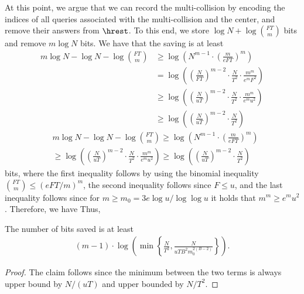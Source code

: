 At this point, we argue that we can record the multi-collision by encoding the indices of all queries associated with the multi-collision and the center, and remove their answers from $\hrest$. 
To this end, we store $\log N+\log\binom{FT}{m}$ bits and remove $m \log N$ bits. 
We have that the saving is at least 
\ifnum{}
\begin{align}
 m\log N - \log N-\log\binom{FT}{m} &\ge \log \left(N^{m-1}\cdot \left(\frac{m}{eFT}\right)^m\right)\nonumber\\
 & = \log \left(\left(\frac{N}{FT}\right)^{m-2}\cdot \frac{N}{T^2} \cdot\frac{m^m}{e^mF^2}\right)\nonumber\\
  & \ge \log \left(\left(\frac{N}{uT}\right)^{m-2}\cdot \frac{N}{T^2} \cdot\frac{m^m}{e^mu^2}\right)\nonumber\\
  & \ge \log \left(\left(\frac{N}{uT}\right)^{m-2}\cdot \frac{N}{T^2}\right) \label{eq:savings5MC}
\end{align}
\else
\begin{align}
 & m\log N - \log N-\log\binom{FT}{m} \ge \log \left(N^{m-1}\cdot \left(\frac{m}{eFT}\right)^m\right)\nonumber\\
 &  \ge \log \left(\left(\frac{N}{uT}\right)^{m-2}\cdot \frac{N}{T^2} \cdot\frac{m^m}{e^mu^2}\right)
  \ge \log \left(\left(\frac{N}{uT}\right)^{m-2}\cdot \frac{N}{T^2}\right) \label{eq:savings5MC}
\end{align}
\fi
bits, where the first inequality follows by using the binomial inequality $\binom{FT}{m}\leq (eFT/m)^m$, the second inequality follows since $F\le u$, and the last inequality follows since for $m \ge m_0 = 3e \log u / \log\log u$ it holds that $m^m \ge e^mu^2$.
\ifnum{} Therefore, we have \else Thus,\fi
\begin{myclaim}
The number of bits saved is at least 
\begin{align*}
(m-1)\cdot\log\left( \min\left\{\frac{N}{T^2},\frac{N}{uTB^2m_0^{2(B-2)}}\right\}\right).
\end{align*} 
\end{myclaim} 
\begin{proof}
The claim follows since the minimum between the two terms is always upper bound by $N/(uT)$ and upper bounded by $N/T^2$.
%
\end{proof}


